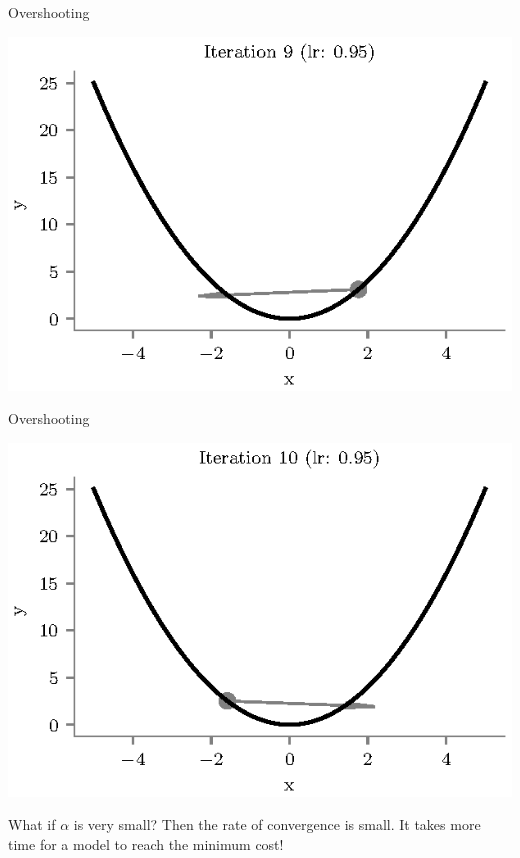 \documentclass{beamer}
\begin{document}
\begin{frame}{Overshooting}
\begin{center}
\includegraphics[totalheight=6cm]{gradient-descent/overshooting-9.eps}
\end{center}
\end{frame}

\begin{frame}{Overshooting}
\begin{center}
\includegraphics[totalheight=6cm]{gradient-descent/overshooting-10.eps}
\end{center}
\end{frame}

\begin{frame}{What if $\alpha$ is very small?}
Then the rate of convergence is small. It takes more time for a model to reach the minimum cost!
\end{frame}
\end{document}
